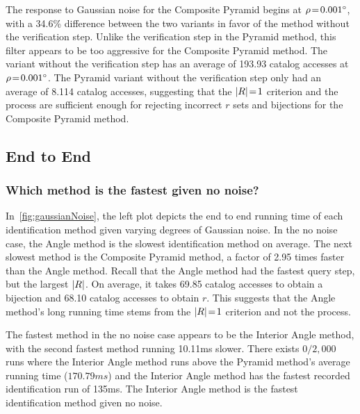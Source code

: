 The response to Gaussian noise for the Composite Pyramid begins at $\rho\!=\!\ang{0.001}$, with a 34.6\% difference
between the two variants in favor of the method without the verification step.
Unlike the verification step in the Pyramid method, this filter appears to be too aggressive for the Composite Pyramid
method.
The variant without the verification step has an average of 193.93 catalog accesses at $\rho\!=\!\ang{0.001}$.
The Pyramid variant without the verification step only had an average of 8.114 catalog accesses, suggesting that the
$\left| R \right| \!=\! 1$ criterion and the  process are sufficient enough for rejecting incorrect $r$ sets and
bijections for the Composite Pyramid method.

\subsection{End to End}\label{subsec:endToEndEvaluation}
\subsubsection{Which method is the fastest given no noise?}
In~\autoref{fig:gaussianNoise}, the left plot depicts the end to end running time of each identification method given
varying degrees of Gaussian noise.
In the no noise case, the Angle method is the slowest identification method on average.
The next slowest method is the Composite Pyramid method, a factor of 2.95 times faster than the Angle method.
Recall that the Angle method had the fastest query step, but the largest $\left| R \right|$.
On average, it takes 69.85 catalog accesses to obtain a bijection and 68.10 catalog accesses to obtain $r$.
This suggests that the Angle method's long running time stems from the $\left| R \right| \!=\! 1$ criterion and not the
 process.

The fastest method in the no noise case appears to be the Interior Angle method, with the second fastest method running
10.11\si{ms} slower.
There exists $0 / 2{,}000$ runs where the Interior Angle method runs above the Pyramid method's average running time
($170.79\si{ms}$) and the Interior Angle method has the fastest recorded identification run of 135ms.
The Interior Angle method is the fastest identification method given no noise.

